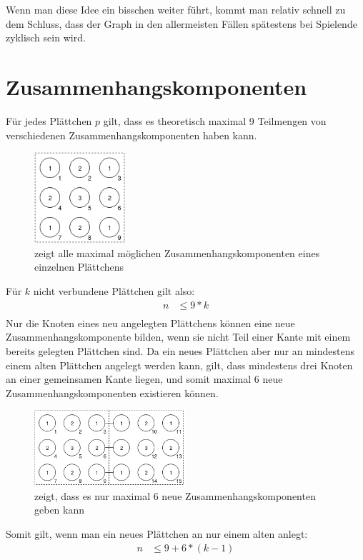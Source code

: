 \documentclass{article}
\begin{document}
Wenn man diese Idee ein bisschen weiter f\"uhrt, kommt man relativ schnell zu dem Schluss, dass der Graph in den allermeisten F\"allen sp\"atestens bei Spielende zyklisch sein wird.

\section{Zusammenhangskomponenten}
F\"ur jedes Pl\"attchen $p$ gilt, dass es theoretisch maximal 9 Teilmengen von verschiedenen Zusammenhangskomponenten haben kann.
\begin{figure}[H]
	\centering
	\includegraphics[width=0.3\textwidth]{aufgabe2_0.png}
	\caption{zeigt alle maximal m\"oglichen Zusammenhangskomponenten eines einzelnen Pl\"attchens}
\end{figure}
F\"ur $k$ nicht verbundene Pl\"attchen gilt also:
\begin{align*}
n &\leq 9 * k\\
\end{align*}
Nur die Knoten eines neu angelegten Pl\"attchens k\"onnen eine neue Zusammenhangskomponente bilden, wenn sie nicht Teil einer Kante mit einem bereits gelegten Pl\"attchen sind. Da ein neues Pl\"attchen aber nur an mindestens einem alten Pl\"attchen angelegt werden kann, gilt, dass mindestens drei Knoten an einer gemeinsamen Kante liegen, und somit maximal 6 neue Zusammenhangskomponenten existieren k\"onnen. 
\begin{figure}[H]
	\centering
	\includegraphics[width=0.5\textwidth]{aufgabe2_1.png}
	\caption{zeigt, dass es nur maximal 6 neue Zusammenhangskomponenten geben kann}
\end{figure}
Somit gilt, wenn man ein neues Pl\"attchen an nur einem alten anlegt:
\begin{align*}
n &\leq 9 + 6*(k-1)
\end{align*}
\end{document}

